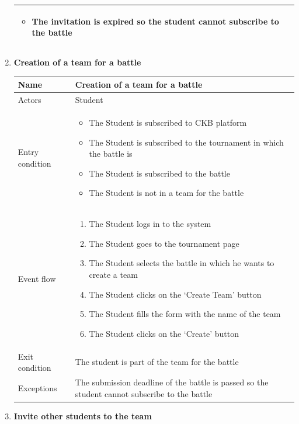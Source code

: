 \begin{enumerate}[label=UC\arabic*:]
\begin{tabular}{|p{3cm}|p{8cm}|}
\begin{itemize}
            \item The invitation is expired so the student cannot subscribe to the battle
        \end{itemize} \\
        \hline
    \end{tabular}
    \item \textbf{Creation of a team for a battle} \\
    \begin{tabular}{|p{3cm}|p{8cm}|}
        \hline
        Name & Creation of a team for a battle \\
        \hline
        Actors & Student \\
        \hline
        Entry condition &
        \begin{itemize}
            \item The Student is subscribed to CKB platform
            \item The Student is subscribed to the tournament in which the battle is
            \item The Student is subscribed to the battle
            \item The Student is not in a team for the battle
        \end{itemize} \\
        \hline
        Event flow &
        \begin{enumerate}[label=\arabic*.]
            \item The Student logs in to the system
            \item The Student goes to the tournament page
            \item The Student selects the battle in which he wants to create a team
            \item The Student clicks on the `Create Team' button
            \item The Student fills the form with the name of the team
            \item The Student clicks on the `Create' button
        \end{enumerate} \\
        \hline
        Exit condition & The student is part of the team for the battle \\
        \hline
        Exceptions & The submission deadline of the battle is passed so the student cannot subscribe to the battle \\
        \hline
    \end{tabular}
    \item \textbf{Invite other students to the team} \\

\end{enumerate}
